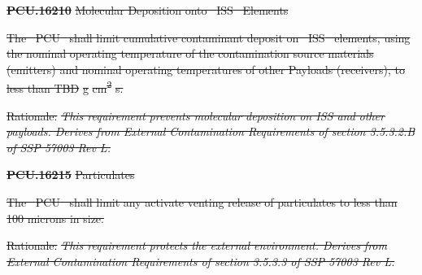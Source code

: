 \documentclass[12pt,oneside,oldfontcommands]{memoir}
\providecommand{\DIFdeltex}[1]{{\protect\color{red}\sout{#1}}}                      %
\providecommand{\DIFdel}[1]{\texorpdfstring{\DIFdeltex{#1}}{}} %
\begin{document}
\textbf{%
\DIFdel{PCU.16210}%
} %
\DIFdel{Molecular Deposition onto \mbox{%
\gls{ISS} }\hspace{0pt}%
Elements
}%

\DIFdel{The \mbox{%
\gls{PCU} }\hspace{0pt}%
shall limit cumulative contaminant deposit on \mbox{%
\gls{ISS} }\hspace{0pt}%
elements, using the nominal operating temperature of the contamination source materials (emitters) and nominal operating temperatures of other Payloads (receivers), to less than TBD}%
\DIFdel{g}%
\DIFdel{cm\textsuperscript{2}}%
\DIFdel{s.
}%

\begin{itemize}%
\DIFdel{Rationale: }\emph{\DIFdel{This requirement prevents molecular deposition on ISS and other payloads. Derives from External Contamination Requirements of section 3.5.3.2.B of SSP 57003 Rev L.}}


\end{itemize}%

\textbf{%
\DIFdel{PCU.16215}%
} %
\DIFdel{Particulates
}%

\DIFdel{The \mbox{%
\gls{PCU} }\hspace{0pt}%
shall limit any activate venting release of particulates to less than 100 microns in size.
}%

\begin{itemize}%
\DIFdel{Rationale: }\emph{\DIFdel{This requirement protects the external environment. Derives from External Contamination Requirements of section 3.5.3.3 of SSP 57003 Rev L.}}


\end{itemize}%
\end{document}
